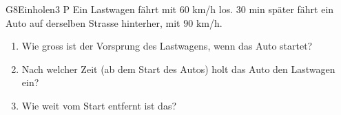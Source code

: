\documentclass[11pt]{article}
\begin{document}
\begin{lpaufgabe}{G8}{Einholen}{3 P}
Ein Lastwagen fährt mit $60$ km/h los. $30$ min später fährt ein Auto auf derselben Strasse hinterher, mit $90$ km/h.
\begin{enumerate}[label=(\alph*),leftmargin=*,itemsep=3pt]
\item Wie gross ist der Vorsprung des Lastwagens, wenn das Auto startet?
\item Nach welcher Zeit (ab dem Start des Autos) holt das Auto den Lastwagen ein?
\item Wie weit vom Start entfernt ist das?
\end{enumerate}
\end{lpaufgabe}
\end{document}
